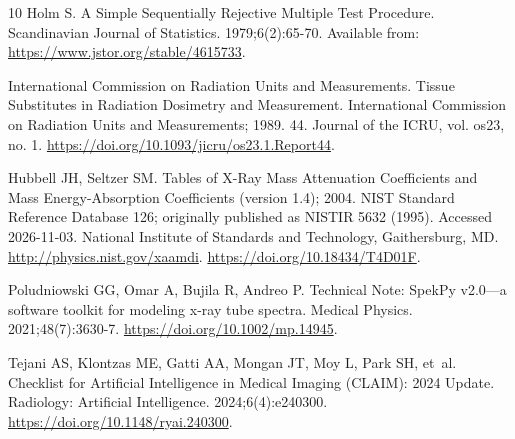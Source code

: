 \begin{thebibliography}{10}
Holm S.
\newblock A Simple Sequentially Rejective Multiple Test Procedure.
\newblock Scandinavian Journal of Statistics. 1979;6(2):65-70.
\newblock Available from: \url{https://www.jstor.org/stable/4615733}.

{International Commission on Radiation Units and Measurements}.
\newblock Tissue Substitutes in Radiation Dosimetry and Measurement.
\newblock International Commission on Radiation Units and Measurements; 1989.
  44.
\newblock Journal of the ICRU, vol. os23, no. 1.
\newblock \url{https://doi.org/10.1093/jicru/os23.1.Report44}.

Hubbell JH, Seltzer SM. Tables of {X}-Ray Mass Attenuation Coefficients and
  Mass Energy-Absorption Coefficients (version 1.4); 2004.
\newblock NIST Standard Reference Database 126; originally published as NISTIR
  5632 (1995). Accessed 2026-11-03.
\newblock National Institute of Standards and Technology, Gaithersburg, MD.
  \url{http://physics.nist.gov/xaamdi}.
\newblock \url{https://doi.org/10.18434/T4D01F}.

Poludniowski GG, Omar A, Bujila R, Andreo P.
\newblock Technical Note: {SpekPy} v2.0---a software toolkit for modeling x-ray
  tube spectra.
\newblock Medical Physics. 2021;48(7):3630-7.
\newblock \url{https://doi.org/10.1002/mp.14945}.

Tejani AS, Klontzas ME, Gatti AA, Mongan JT, Moy L, Park SH, et~al.
\newblock Checklist for Artificial Intelligence in Medical Imaging ({CLAIM}):
  2024 Update.
\newblock Radiology: Artificial Intelligence. 2024;6(4):e240300.
\newblock \url{https://doi.org/10.1148/ryai.240300}.

\end{thebibliography}
